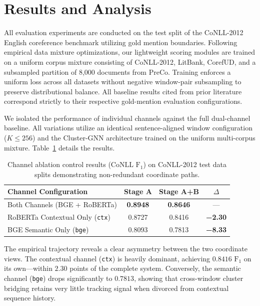 \documentclass[12pt]{article}
\begin{document}
	\section{Results and Analysis}\label{sec:results}
	All evaluation experiments are conducted on the test split of the CoNLL-2012 English coreference benchmark \citep{pradhan2012conll} utilizing gold mention boundaries. Following empirical data mixture optimizations, our lightweight scoring modules are trained on a uniform corpus mixture consisting of CoNLL-2012, LitBank, CorefUD, and a subsampled partition of 8,000 documents from PreCo. Training enforces a uniform loss across all datasets without negative window-pair subsampling to preserve distributional balance. All baseline results cited from prior literature correspond strictly to their respective gold-mention evaluation configurations.
	
	We isolated the performance of individual channels against the full dual-channel baseline. All variations utilize an identical sentence-aligned window configuration ($K \le 256$) and the Cluster-GNN architecture trained on the uniform multi-corpus mixture. Table~\ref{tab:ablation} details the results.
	
	\begin{table}[ht]
		\centering
		\small
		\begin{tabular}{lccc}
			\toprule
			\textbf{Channel Configuration} & \textbf{Stage A} & \textbf{Stage A+B} & \textbf{$\Delta$} \\
			\midrule
			Both Channels (BGE + RoBERTa)   & \textbf{0.8948} & \textbf{0.8646} & — \\
			RoBERTa Contextual Only (\texttt{ctx}) & 0.8727          & 0.8416          & \textbf{−2.30} \\
			BGE Semantic Only (\texttt{bge})      & 0.8093          & 0.7813          & \textbf{−8.33} \\
			\bottomrule
		\end{tabular}
		\caption{Channel ablation control results ($\text{CoNLL F}_1$) on CoNLL-2012 test data splits demonstrating non-redundant coordinate paths.}
		\label{tab:ablation}
	\end{table}
	
	The empirical trajectory reveals a clear asymmetry between the two coordinate views. The contextual channel (\texttt{ctx}) is heavily dominant, achieving $0.8416$ $\text{F}_1$ on its own—within $2.30$ points of the complete system. Conversely, the semantic channel (\texttt{bge}) drops significantly to $0.7813$, showing that cross-window cluster bridging retains very little tracking signal when divorced from contextual sequence history.
	
\end{document}
